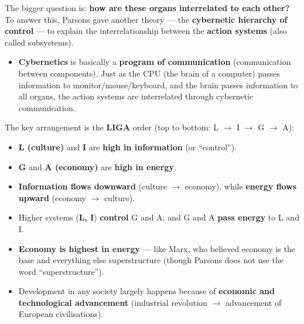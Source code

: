 The bigger question is: \textbf{how are these organs interrelated to each other?} To answer this, Parsons gave another theory --- the \textbf{cybernetic hierarchy of control} --- to explain the interrelationship between the \textbf{action systems} (also called subsystems).

\begin{KeyConcept}
\begin{itemize}
\item \textbf{Cybernetics} is basically a \textbf{program of communication} (communication between components). Just as the CPU (the brain of a computer) passes information to monitor/mouse/keyboard, and the brain passes information to all organs, the action systems are interrelated through cybernetic communication.
\end{itemize}
\end{KeyConcept}

The key arrangement is the \textbf{LIGA} order (top to bottom: L $\rightarrow$ I $\rightarrow$ G $\rightarrow$ A):
\begin{itemize}
\item \textbf{L (culture)} and \textbf{I} are \textbf{high in information} (or ``control'').
\item \textbf{G} and \textbf{A (economy)} are \textbf{high in energy}.
\item \textbf{Information flows downward} (culture $\rightarrow$ economy), while \textbf{energy flows upward} (economy $\rightarrow$ culture).
\end{itemize}

\begin{DataFact}
\begin{itemize}
\item Higher systems (\textbf{L, I}) \textbf{control} G and A; and G and A \textbf{pass energy} to L and I.
\item \textbf{Economy is highest in energy} --- like Marx, who believed economy is the base and everything else superstructure (though Parsons does not use the word ``superstructure'').
\item Development in any society largely happens because of \textbf{economic and technological advancement} (industrial revolution $\rightarrow$ advancement of European civilisations).
\end{itemize}
\end{DataFact}

